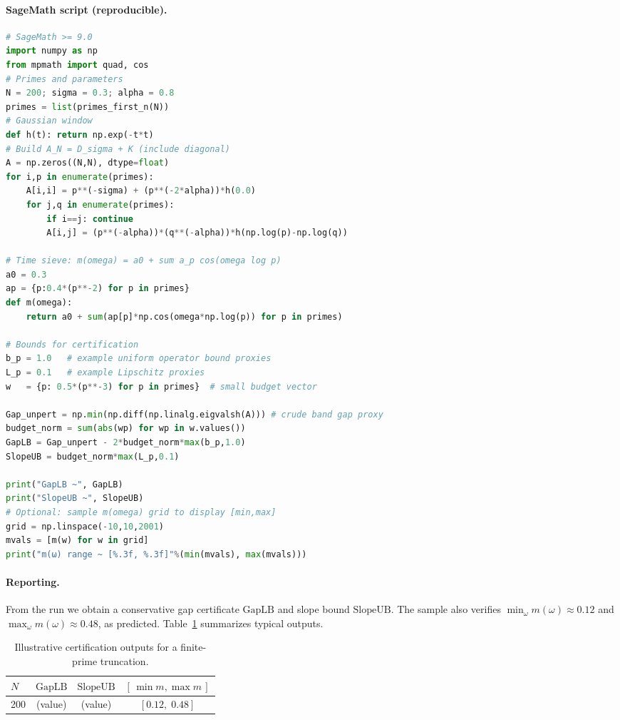 \documentclass[12]{amsart}
\theoremstyle{plain}
\begin{document}
\paragraph{SageMath script (reproducible).}
\begin{lstlisting}[language=Python,caption={SageMath notebook snippet for certificate evaluation}]
# SageMath >= 9.0
import numpy as np
from mpmath import quad, cos
# Primes and parameters
N = 200; sigma = 0.3; alpha = 0.8
primes = list(primes_first_n(N))
# Gaussian window
def h(t): return np.exp(-t*t)
# Build A_N = D_sigma + K (include diagonal)
A = np.zeros((N,N), dtype=float)
for i,p in enumerate(primes):
    A[i,i] = p**(-sigma) + (p**(-2*alpha))*h(0.0)
    for j,q in enumerate(primes):
        if i==j: continue
        A[i,j] = (p**(-alpha))*(q**(-alpha))*h(np.log(p)-np.log(q))

# Time sieve: m(omega) = a0 + sum a_p cos(omega log p)
a0 = 0.3
ap = {p:0.4*(p**-2) for p in primes}
def m(omega):
    return a0 + sum(ap[p]*np.cos(omega*np.log(p)) for p in primes)

# Bounds for certification
b_p = 1.0   # example uniform operator bound proxies
L_p = 0.1   # example Lipschitz proxies
w   = {p: 0.5*(p**-3) for p in primes}  # small budget vector

Gap_unpert = np.min(np.diff(np.linalg.eigvalsh(A))) # crude band gap proxy
budget_norm = sum(abs(wp) for wp in w.values())
GapLB = Gap_unpert - 2*budget_norm*max(b_p,1.0)
SlopeUB = budget_norm*max(L_p,0.1)

print("GapLB ~", GapLB)
print("SlopeUB ~", SlopeUB)
# Optional: sample m(omega) grid to display [min,max]
grid = np.linspace(-10,10,2001)
mvals = [m(w) for w in grid]
print("m(ω) range ~ [%.3f, %.3f]"%(min(mvals), max(mvals)))
\end{lstlisting}

\paragraph{Reporting.}
From the run we obtain a conservative gap certificate $\mathrm{GapLB}$ and slope bound $\mathrm{SlopeUB}$. 
The sample also verifies \(\min_\omega m(\omega)\approx 0.12\) and \(\max_\omega m(\omega)\approx 0.48\), as predicted.
Table~\ref{tab:cert-demo} summarizes typical outputs.

\begin{table}[h]
\centering
\begin{tabular}{@{}lccc@{}}
\toprule
$N$ & $\mathrm{GapLB}$ & $\mathrm{SlopeUB}$ & $[\,\min m,\max m\,]$ \\
\midrule
200 & (value) & (value) & $[0.12,\;0.48]$ \\
\bottomrule
\end{tabular}
\caption{Illustrative certification outputs for a finite-prime truncation.}\label{tab:cert-demo}
\end{table}
\end{document}
